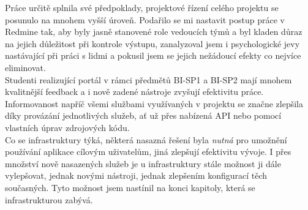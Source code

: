 Práce určitě splnila své předpoklady, projektové řízení celého projektu se posunulo na mnohem vyšší úroveň. Podařilo se mi nastavit postup práce v Redmine tak, aby byly jasně stanovené role vedoucích týmů a byl kladen důraz na jejich důležitost při kontrole výstupu, zanalyzoval jsem i psychologické jevy nastávající při práci s lidmi a pokusil jsem se jejich nežádoucí efekty co nejvíce eliminovat.\\
Studenti realizující portál v rámci předmětů BI-SP1 a BI-SP2 mají mnohem kvalitnější feedback a i nově zadené nástroje zvyšují efektivitu práce. Informovanost napříč všemi službami využívaných v projektu se značne zlepšila díky provázání jednotlivých služeb, ať už přes nabízená API nebo pomocí vlastních úprav zdrojových kódu.\\
Co se infrastruktury týká, některá nasazná řešení byla \emph{nutná} pro umožnění používání aplikace cílovým uživatelům, jiná zlepšují efektivitu vývoje. I přes množství nově nasazených služeb je u infrastruktury stále možnost ji dále vylepšovat, jednak novými nástroji, jednak zlepšením konfigurací těch současných. Tyto možnost jsem nastínil na konci kapitoly, která se infrastrukturou zabývá.